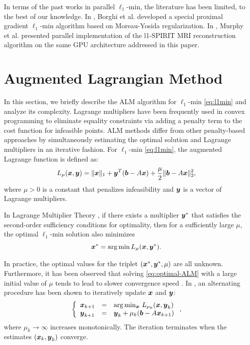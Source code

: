 \documentclass[preprint]{sigplanconf}
\begin{document}
In terms of the past works in parallel $\ell_1$-min, the literature has been
limited, to the best of our knowledge. In \cite{BorghiA2010}, Borghi et al.
developed a special proximal gradient $\ell_1$-min algorithm based on
Moreau-Yosida regularization. In \cite{MurphyM2010}, Murphy et al. presented
parallel implementation of the l1-SPIRIT MRI reconstruction algorithm on 
the same GPU architecture addressed in this paper.

\section{Augmented Lagrangian Method}
\label{sec:ALM}
In this section, we briefly describe the ALM algorithm for $\ell_1$-min
\eqref{eq:l1min} \cite{YangA2010-ICIP} and analyze its complexity. Lagrange
multipliers have been frequently used in convex programming to eliminate
equality constraints via adding a penalty term to the cost function for
infeasible points. ALM methods differ from other penalty-based approaches by
simultaneously estimating the optimal solution and Lagrange multipliers in an
iterative fashion.  For $\ell_1$-min \eqref{eq:l1min}, the augmented Lagrange
function is defined as: 
\begin{equation} L_\mu({\boldsymbol{x}},{\boldsymbol{y}}) = \|{\boldsymbol{x}}\|_1 +
{\boldsymbol{y}}^T({\boldsymbol{b}} - A{\boldsymbol{x}}) + \frac{\mu}{2} \| {\boldsymbol{b}}-A{\boldsymbol{x}} \|_2^2, 
\end{equation}
where $\mu > 0$ is a constant that penalizes infeasibility and ${\boldsymbol{y}}$ is a
vector of Lagrange multipliers.

In Lagrange Multiplier Theory \cite{BertsekasD2003}, if there exists a multiplier $\boldsymbol{y}^*$ that
satisfies the second-order sufficiency conditions for optimality, then for a sufficiently large $\mu$, the optimal
$\ell_1$-min solution also minimizes
\begin{equation}
{\boldsymbol{x}}^* = \arg \min L_\mu({\boldsymbol{x}},{\boldsymbol{y}}^*).
\label{eq:optimal-ALM}
\end{equation}

In practice, the optimal values for the triplet $({\boldsymbol{x}}^*, {\boldsymbol{y}}^*, \mu)$ are all
unknown. Furthermore, it has been observed that solving
\eqref{eq:optimal-ALM} with a large initial value of $\mu$ tends to lead to
slower convergence speed \cite{WrightS2008,YangA2010-ICIP}. In
\cite{BertsekasD2003,YangJ2009}, an alternating procedure has been shown to
iteratively update ${\boldsymbol{x}}$ and ${\boldsymbol{y}}$:
\begin{equation}
\left \{
\begin{array}{lll}
{\boldsymbol{x}}_{k+1} & = & \arg\min_{{\boldsymbol{x}}} \, L_{\mu_k} ({\boldsymbol{x}},{\boldsymbol{y}}_k)\\
{\boldsymbol{y}}_{k+1} & = & {\boldsymbol{y}}_k + \mu_k ({\boldsymbol{b}} - A{\boldsymbol{x}}_{k+1}) \\
\end{array}
\right . ,
\label{eq:alm}
\end{equation}
where $\mu_{k}\rightarrow \infty$ increases monotonically.
The iteration terminates when the estimates $({\boldsymbol{x}}_k, {\boldsymbol{y}}_k)$ converge.
\end{document}
